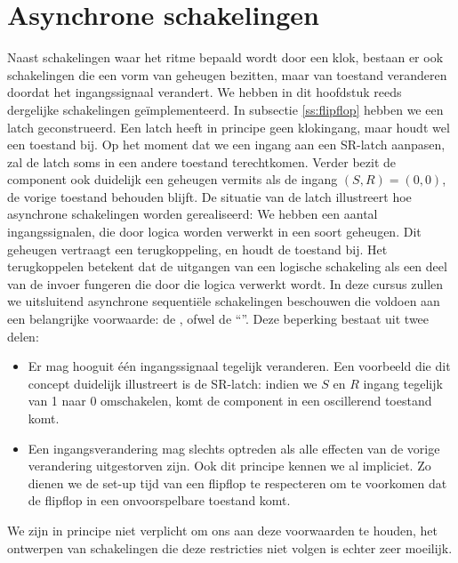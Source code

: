 \section{Asynchrone schakelingen}
\label{s:asynchroneSequence}
Naast schakelingen waar het ritme bepaald wordt door een klok, bestaan er ook schakelingen die een vorm van geheugen bezitten, maar van toestand veranderen doordat het ingangssignaal verandert. We hebben in dit hoofdstuk reeds dergelijke schakelingen ge\"implementeerd. In subsectie \ref{ss:flipflop} hebben we een latch geconstrueerd. Een latch heeft in principe geen klokingang, maar houdt wel een toestand bij. Op het moment dat we een ingang aan een SR-latch aanpasen, zal de latch soms in een andere toestand terechtkomen. Verder bezit de component ook duidelijk een geheugen vermits als de ingang $\left(S,R\right)=\left(0,0\right)$, de vorige toestand behouden blijft. De situatie van de latch illustreert hoe asynchrone schakelingen worden gerealiseerd: We hebben een aantal ingangssignalen, die door logica worden verwerkt in een soort geheugen. Dit geheugen vertraagt een terugkoppeling, en houdt de toestand bij. Het terugkoppelen betekent dat de uitgangen van een logische schakeling als een deel van de invoer fungeren die door die logica verwerkt wordt. In deze cursus zullen we uitsluitend asynchrone sequenti\"ele schakelingen beschouwen die voldoen aan een belangrijke voorwaarde: de , ofwel de ``''. Deze beperking bestaat uit twee delen:
\begin{itemize}
 \item Er mag hooguit \'e\'en ingangssignaal tegelijk veranderen. Een voorbeeld die dit concept duidelijk illustreert is de SR-latch: indien we $S$ en $R$ ingang tegelijk van 1 naar 0 omschakelen, komt de component in een oscillerend toestand komt.
 \item Een ingangsverandering mag slechts optreden als alle effecten van de vorige verandering uitgestorven zijn. Ook dit principe kennen we al impliciet. Zo dienen we de set-up tijd van een flipflop te respecteren om te voorkomen dat de flipflop in een onvoorspelbare toestand komt.
\end{itemize}
We zijn in principe niet verplicht om ons aan deze voorwaarden te houden, het ontwerpen van schakelingen die deze restricties niet volgen is echter zeer moeilijk.
